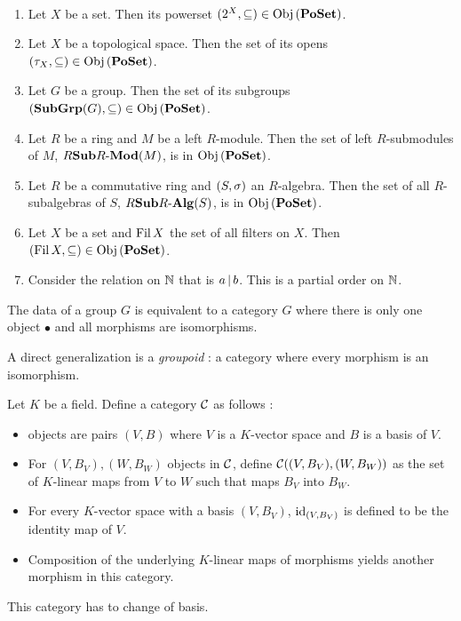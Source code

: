 \begin{eg}~
  \begin{enumerate}
    \item Let $X$ be a set. 
    Then its powerset $(2^X,\subseteq) \in \mathrm{Obj}\left(\mathbf{PoSet}\right)$.
    \item Let $X$ be a topological space. 
    Then the set of its opens $(\tau_X,\subseteq) \in \mathrm{Obj}\left(\mathbf{PoSet}\right)$.
    \item Let $G$ be a group. 
    Then the set of its subgroups $(\mathbf{Sub}\mathbf{Grp}(G),\subseteq)\in\mathrm{Obj}\left(\mathbf{PoSet}\right)$.
    \item Let $R$ be a ring and $M$ be a left $R$-module.
    Then the set of left $R$-submodules of $M$, $R\mathbf{Sub}R\text{-}\mathbf{Mod}(M)$,
    is in $\mathrm{Obj}\left(\mathbf{PoSet}\right)$.
    \item Let $R$ be a commutative ring and $(S,\sigma)$ an $R$-algebra. 
    Then the set of all $R$-subalgebras of $S$, $R\mathbf{Sub}R\text{-}\mathbf{Alg}(S)$, 
    is in $\mathrm{Obj}\left(\mathbf{PoSet}\right)$. 
    \item Let $X$ be a set and $\operatorname{Fil} X$ the set of all filters on $X$.
    Then $(\operatorname{Fil} X,\subseteq) \in \mathrm{Obj}\left(\mathbf{PoSet}\right)$. 
    \item Consider the relation on $\mathbb{N}$ that is $a \,|\, b$. 
    This is a partial order on $\mathbb{N}$. 
  \end{enumerate}
\end{eg}

\begin{eg}
  
  The data of a group $G$ is equivalent to 
  a category $G$ where there is only one object $\bullet$ and 
  all morphisms are isomorphisms. 

  A direct generalization is a \emph{groupoid} : 
  a category where every morphism is an isomorphism. 
\end{eg}

\begin{eg}
  Let $K$ be a field. 
  Define a category $\mathcal{C}$ as follows : 
  \begin{itemize}
    \item objects are pairs $(V,B)$ where $V$ is a $K$-vector space and 
    $B$ is a basis of $V$. 
    \item For $(V,B_V), (W,B_W)$ objects in $\mathcal{C}$, 
    define $\mathcal{C}((V,B_V),(W,B_W))$ as the set of $K$-linear maps 
    from $V$ to $W$ such that maps $B_V$ into $B_W$.
    \item For every $K$-vector space with a basis $(V,B_V)$, 
    $\mathrm{id}_{(V,B_V)}$ is defined to be the identity map of $V$. 
    \item Composition of the underlying $K$-linear maps of morphisms yields
    another morphism in this category. 
  \end{itemize}
  This category has  to change of basis. 
\end{eg}